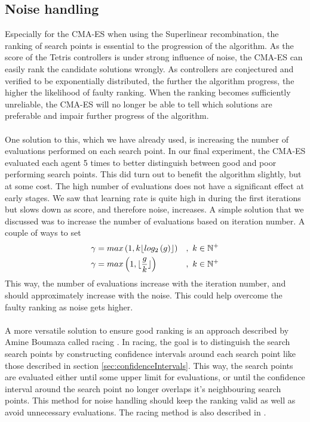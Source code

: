 \subsection{Noise handling}

Especially for the CMA-ES when using the Superlinear recombination, the ranking of search
points is essential to the progression of the algorithm. As the score of the Tetris controllers
is under strong influence of noise, the CMA-ES can easily rank the 
candidate solutions wrongly. As controllers are conjectured and verified to
be exponentially distributed, the further the algorithm progress, the higher the likelihood
of faulty ranking. When the ranking becomes sufficiently unreliable, the CMA-ES will
no longer be able to tell which solutions are preferable and impair further progress
of the algorithm.\\
\\
One solution to this, which we have already used, is increasing the number of evaluations
performed on each search point. In our final experiment, the CMA-ES evaluated each agent
5 times to better distinguish between good and poor performing search points. This did turn out
to benefit the algorithm slightly, but at some cost. The high number of evaluations does not have a
significant effect at early stages. We saw that learning rate is quite high in during the first 
iterations but slows down as score, and therefore noise, increases. A simple solution
that we discussed  was to increase the number of evaluations based on iteration number.
A couple of ways to set 
\begin{align}
\gamma &=  max\left( 1, k \lfloor log_{2} \left( g \right)  \rfloor \right) &,\ k \in \mathbb{N}^+\\
\gamma &=  max\left( 1, \lfloor \frac{g}{k} \rfloor \right) &,\ k \in \mathbb{N}^+
\end{align}
This way, the number of evaluations increase with the iteration number, and should approximately
increase with the noise. This could help overcome the faulty ranking as noise gets higher.\\
\\
A more versatile solution to ensure good ranking is an approach described by
Amine Boumaza called racing \citep{boumaza2011:b}. In racing, the goal is to 
distinguish the search search points by constructing confidence intervals around each
search point like those described in section \ref{sec:confidenceIntervals}.
This way, the search points are evaluated either until some upper limit for evaluations,
or until the confidence interval around the search point no longer overlaps it's
neighbouring search points. This method for noise handling should keep the ranking 
valid as well as avoid unnecessary evaluations. The racing method is also described in 
\citep{heidrich-meisner:09c}.


